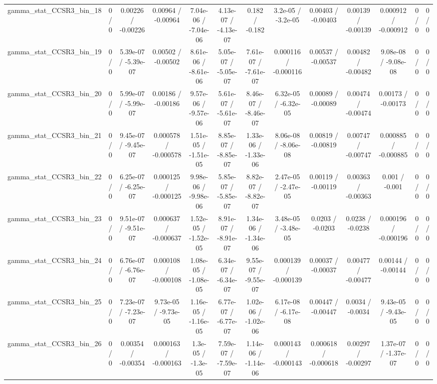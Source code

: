 \documentclass[10pt]{article}
\begin{document}
\begin{table}[htbp]
\begin{center}
\begin{tabular}{|c|c|c|c|c|c|c|c|c|c|c|c|c|}
  gamma_stat_CCSR3_bin_18 & 0 / 0 & 0.00226 / -0.00226 & 0.00964 / -0.00964 & 7.04e-06 / -7.04e-06 & 4.13e-07 / -4.13e-07 & 0.182 / -0.182 & 3.2e-05 / -3.2e-05 & 0.00403 / -0.00403 & 0.00139 / -0.00139 & 0.000912 / -0.000912 & 0 / 0 & 0 / 0 \\ 
  gamma_stat_CCSR3_bin_19 & 0 / 0 & 5.39e-07 / -5.39e-07 & 0.00502 / -0.00502 & 8.61e-06 / -8.61e-06 & 5.05e-07 / -5.05e-07 & 7.61e-07 / -7.61e-07 & 0.000116 / -0.000116 & 0.00537 / -0.00537 & 0.00482 / -0.00482 & 9.08e-08 / -9.08e-08 & 0 / 0 & 0 / 0 \\ 
  gamma_stat_CCSR3_bin_20 & 0 / 0 & 5.99e-07 / -5.99e-07 & 0.00186 / -0.00186 & 9.57e-06 / -9.57e-06 & 5.61e-07 / -5.61e-07 & 8.46e-07 / -8.46e-07 & 6.32e-05 / -6.32e-05 & 0.00089 / -0.00089 & 0.00474 / -0.00474 & 0.00173 / -0.00173 & 0 / 0 & 0 / 0 \\ 
  gamma_stat_CCSR3_bin_21 & 0 / 0 & 9.45e-07 / -9.45e-07 & 0.000578 / -0.000578 & 1.51e-05 / -1.51e-05 & 8.85e-07 / -8.85e-07 & 1.33e-06 / -1.33e-06 & 8.06e-08 / -8.06e-08 & 0.00819 / -0.00819 & 0.00747 / -0.00747 & 0.000885 / -0.000885 & 0 / 0 & 0 / 0 \\ 
  gamma_stat_CCSR3_bin_22 & 0 / 0 & 6.25e-07 / -6.25e-07 & 0.000125 / -0.000125 & 9.98e-06 / -9.98e-06 & 5.85e-07 / -5.85e-07 & 8.82e-07 / -8.82e-07 & 2.47e-05 / -2.47e-05 & 0.00119 / -0.00119 & 0.00363 / -0.00363 & 0.001 / -0.001 & 0 / 0 & 0 / 0 \\ 
  gamma_stat_CCSR3_bin_23 & 0 / 0 & 9.51e-07 / -9.51e-07 & 0.000637 / -0.000637 & 1.52e-05 / -1.52e-05 & 8.91e-07 / -8.91e-07 & 1.34e-06 / -1.34e-06 & 3.48e-05 / -3.48e-05 & 0.0203 / -0.0203 & 0.0238 / -0.0238 & 0.000196 / -0.000196 & 0 / 0 & 0 / 0 \\ 
  gamma_stat_CCSR3_bin_24 & 0 / 0 & 6.76e-07 / -6.76e-07 & 0.000108 / -0.000108 & 1.08e-05 / -1.08e-05 & 6.34e-07 / -6.34e-07 & 9.55e-07 / -9.55e-07 & 0.000139 / -0.000139 & 0.00037 / -0.00037 & 0.00477 / -0.00477 & 0.00144 / -0.00144 & 0 / 0 & 0 / 0 \\ 
  gamma_stat_CCSR3_bin_25 & 0 / 0 & 7.23e-07 / -7.23e-07 & 9.73e-05 / -9.73e-05 & 1.16e-05 / -1.16e-05 & 6.77e-07 / -6.77e-07 & 1.02e-06 / -1.02e-06 & 6.17e-08 / -6.17e-08 & 0.00447 / -0.00447 & 0.0034 / -0.0034 & 9.43e-05 / -9.43e-05 & 0 / 0 & 0 / 0 \\ 
  gamma_stat_CCSR3_bin_26 & 0 / 0 & 0.00354 / -0.00354 & 0.000163 / -0.000163 & 1.3e-05 / -1.3e-05 & 7.59e-07 / -7.59e-07 & 1.14e-06 / -1.14e-06 & 0.000143 / -0.000143 & 0.000618 / -0.000618 & 0.00297 / -0.00297 & 1.37e-07 / -1.37e-07 & 0 / 0 & 0 / 0 \\ 

\end{tabular}
\end{center}
\end{table}
\end{document}
